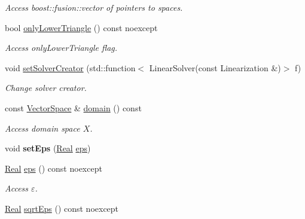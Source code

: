 \begin{DoxyCompactItemize}
\begin{DoxyCompactList}\small\item\em \-Access boost\-::fusion\-::vector of pointers to spaces. \end{DoxyCompactList}\item 
bool \hyperlink{classSpacy_1_1Kaskade_1_1C2Functional_a37152b2b1413e611d229a61318b86768}{only\-Lower\-Triangle} () const noexcept
\begin{DoxyCompactList}\small\item\em \-Access only\-Lower\-Triangle flag. \end{DoxyCompactList}\item 
void \hyperlink{classSpacy_1_1Kaskade_1_1C2Functional_ac9496fdef4f38eb466d5b5b58089be8b}{set\-Solver\-Creator} (std\-::function$<$ \-Linear\-Solver(const \-Linearization \&)$>$ f)
\begin{DoxyCompactList}\small\item\em \-Change solver creator. \end{DoxyCompactList}\item 
\hypertarget{classSpacy_1_1FunctionalBase_a2d3397deb9fa1ad85ed04e37a03b3aa6}{const \hyperlink{classSpacy_1_1VectorSpace}{\-Vector\-Space} \& \hyperlink{classSpacy_1_1FunctionalBase_a2d3397deb9fa1ad85ed04e37a03b3aa6}{domain} () const }\label{classSpacy_1_1FunctionalBase_a2d3397deb9fa1ad85ed04e37a03b3aa6}

\begin{DoxyCompactList}\small\item\em \-Access domain space $X$. \end{DoxyCompactList}\item 
\hypertarget{classSpacy_1_1Mixin_1_1Eps_a6b4c38a60848c0ab665fb3a81e181786}{void {\bfseries set\-Eps} (\hyperlink{classSpacy_1_1Real}{\-Real} \hyperlink{classSpacy_1_1Mixin_1_1Eps_a812b99b0abc1d78a34b4114907f23f52}{eps})}\label{classSpacy_1_1Mixin_1_1Eps_a6b4c38a60848c0ab665fb3a81e181786}

\item 
\hypertarget{classSpacy_1_1Mixin_1_1Eps_a812b99b0abc1d78a34b4114907f23f52}{\hyperlink{classSpacy_1_1Real}{\-Real} \hyperlink{classSpacy_1_1Mixin_1_1Eps_a812b99b0abc1d78a34b4114907f23f52}{eps} () const noexcept}\label{classSpacy_1_1Mixin_1_1Eps_a812b99b0abc1d78a34b4114907f23f52}

\begin{DoxyCompactList}\small\item\em \-Access $\varepsilon$. \end{DoxyCompactList}\item 
\hypertarget{classSpacy_1_1Mixin_1_1Eps_abd50a47b32614a950189855775a09d05}{\hyperlink{classSpacy_1_1Real}{\-Real} \hyperlink{classSpacy_1_1Mixin_1_1Eps_abd50a47b32614a950189855775a09d05}{sqrt\-Eps} () const noexcept}\label{classSpacy_1_1Mixin_1_1Eps_abd50a47b32614a950189855775a09d05}


\end{DoxyCompactItemize}
